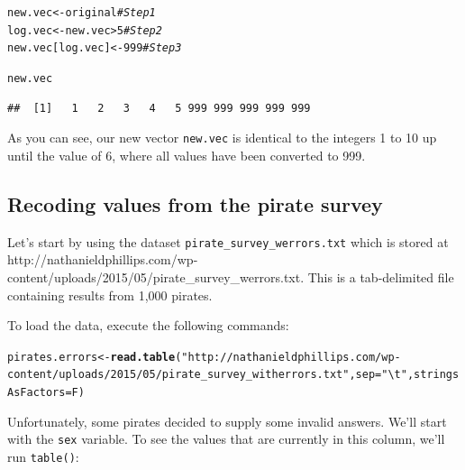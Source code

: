 \documentclass{tufte-book}\usepackage[]{graphicx}\usepackage[]{color}
\makeatletter
\newcommand{\hlnum}[1]{\textcolor[rgb]{0.686,0.059,0.569}{#1}}%
\newcommand{\hlstr}[1]{\textcolor[rgb]{0.192,0.494,0.8}{#1}}%
\newcommand{\hlcom}[1]{\textcolor[rgb]{0.678,0.584,0.686}{\textit{#1}}}%
\newcommand{\hlopt}[1]{\textcolor[rgb]{0,0,0}{#1}}%
\newcommand{\hlstd}[1]{\textcolor[rgb]{0.345,0.345,0.345}{#1}}%
\newcommand{\hlkwb}[1]{\textcolor[rgb]{0.69,0.353,0.396}{#1}}%
\newcommand{\hlkwc}[1]{\textcolor[rgb]{0.333,0.667,0.333}{#1}}%
\newcommand{\hlkwd}[1]{\textcolor[rgb]{0.737,0.353,0.396}{\textbf{#1}}}%
\newenvironment{kframe}{%
 \def\at@end@of@kframe{}%
 \ifinner\ifhmode%
  \def\at@end@of@kframe{\end{minipage}}%
  \begin{minipage}{\columnwidth}%
 \fi\fi%
 \def\FrameCommand##1{\hskip\@totalleftmargin \hskip-\fboxsep
 \colorbox{shadecolor}{##1}\hskip-\fboxsep
     \hskip-\linewidth \hskip-\@totalleftmargin \hskip\columnwidth}%
 \MakeFramed {\advance\hsize-\width
   \@totalleftmargin\z@ \linewidth\hsize
   \@setminipage}}%
 {\par\unskip\endMakeFramed%
 \at@end@of@kframe}
\newenvironment{knitrout}{}{} %
\makeatother
\begin{document}
\begin{footnotesize}
\begin{knitrout}
\begin{kframe}
\begin{alltt}
\hlstd{new.vec} \hlkwb{<-} \hlstd{original} \hlcom{# Step 1}
\hlstd{log.vec} \hlkwb{<-} \hlstd{new.vec} \hlopt{>} \hlnum{5} \hlcom{# Step 2}
\hlstd{new.vec[log.vec]} \hlkwb{<-} \hlnum{999} \hlcom{# Step 3}

\hlstd{new.vec}
\end{alltt}
\begin{verbatim}
##  [1]   1   2   3   4   5 999 999 999 999 999
\end{verbatim}
\end{kframe}
\end{knitrout}

As you can see, our new vector \texttt{new.vec} is identical to the integers 1 to 10 up until the value of 6, where all values have been converted to 999.

\subsection{Recoding values from the pirate survey}
 
Let's start by using the dataset \texttt{pirate\_survey\_werrors.txt} which is stored at http://nathanieldphillips.com/wp-content/uploads/2015/05/pirate\_survey\_werrors.txt. This is a tab-delimited file containing results from 1,000 pirates.

To load the data, execute the following commands:



\begin{knitrout}
\color{fgcolor}\begin{kframe}
\begin{alltt}
\hlstd{pirates.errors} \hlkwb{<-} \hlkwd{read.table}\hlstd{(}\hlstr{"http://nathanieldphillips.com/wp-content/uploads/2015/05/pirate_survey_witherrors.txt"}\hlstd{,} \hlkwc{sep} \hlstd{=} \hlstr{"\textbackslash{}t"}\hlstd{,} \hlkwc{stringsAsFactors} \hlstd{= F)}
\end{alltt}
\end{kframe}
\end{knitrout}


Unfortunately, some pirates decided to supply some invalid answers. We'll start with the \texttt{sex} variable. To see the values that are currently in this column, we'll run \texttt{table()}:


\end{footnotesize}
\end{document}
